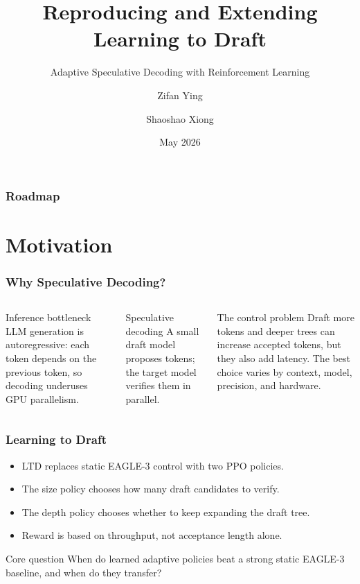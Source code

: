 \documentclass[10pt]{beamer}
\title[LTD Reproduction]{Reproducing and Extending Learning to Draft}
\subtitle{Adaptive Speculative Decoding with Reinforcement Learning}
\author[Ying, Xiong]{Zifan Ying \and Shaoshao Xiong}
\institute[CS498 MLsys]{CS498 Machine Learning Systems}
\date{May 2026}
\begin{document}
\frame{\titlepage}

\begin{frame}
  \frametitle{Roadmap}
  \tableofcontents
\end{frame}

\section{Motivation}

\begin{frame}
  \frametitle{Why Speculative Decoding?}
  \begin{columns}[T]
    \begin{block}{Inference bottleneck}
      LLM generation is autoregressive: each token depends on the previous token, so decoding underuses GPU parallelism.
    \end{block}
    \begin{block}{Speculative decoding}
      A small draft model proposes tokens; the target model verifies them in parallel.
    \end{block}
    \begin{block}{The control problem}
      Draft more tokens and deeper trees can increase accepted tokens, but they also add latency. The best choice varies by context, model, precision, and hardware.
    \end{block}
  \end{columns}
\end{frame}

\begin{frame}
  \frametitle{Learning to Draft}
  \begin{itemize}
    \item LTD replaces static EAGLE-3 control with two PPO policies.
    \item The \alert{size policy} chooses how many draft candidates to verify.
    \item The \alert{depth policy} chooses whether to keep expanding the draft tree.
    \item Reward is based on throughput, not acceptance length alone.
  \end{itemize}

  \vspace{0.4cm}
  \begin{block}{Core question}
    When do learned adaptive policies beat a strong static EAGLE-3 baseline, and when do they transfer?
  \end{block}
\end{frame}
\end{document}
